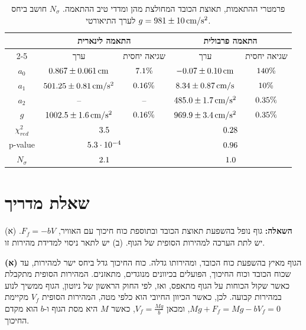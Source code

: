 \documentclass[10pt,a4paper]{article}
\newcommand{\textenglish}[1]{\foreignlanguage{english}{#1}}
\newcommand{\added}[1]{\textcolor{addedblue}{#1}}
\newcommand{\U}[1]{\,\mathrm{#1}}
\begin{document}
\begin{table}[H]
  \centering
  \renewcommand{\arraystretch}{1.3}
  \begin{tabular}{|c|c|c|c|c|}
    \hline
     & \multicolumn{2}{c|}{התאמה לינארית} & \multicolumn{2}{c|}{התאמה פרבולית} \\
    \cline{2-5}
     & ערך & שגיאה יחסית & ערך & שגיאה יחסית \\
    \hline
    $a_0$ & $\LinAZero\U{cm}$ & $7.1\%$ & $\ParAZero\U{cm}$ & $140\%$ \\ %
    \hline
    $a_1$ & $\LinAOne\U{cm/s^2}$ & $0.16\%$ & $\ParAOne\U{cm/s}$ & $10\%$ \\ %
    \hline
    $a_2$ & -- & -- & $\ParATwo\U{cm/s^2}$ & $0.35\%$ \\ %
    \hline
    $g$ & $\LinG\U{cm/s^2}$ & $0.16\%$ & $\ParG\U{cm/s^2}$ & $0.35\%$ \\ %
    \hline
    $\chi^2_{red}$ & \multicolumn{2}{c|}{$3.5$} & \multicolumn{2}{c|}{$0.28$} \\ %
    \hline
    \textenglish{p-value} & \multicolumn{2}{c|}{$5.3 \cdot 10^{-4}$} & \multicolumn{2}{c|}{$0.96$} \\ %
    \hline
    $N_\sigma$ & \multicolumn{2}{c|}{$2.1$} & \multicolumn{2}{c|}{$1.0$} \\ %
    \hline
  \end{tabular}
  \caption{\added{פרמטרי ההתאמות, תאוצת הכובד המחולצת מהן ומדדי טיב ההתאמה. $N_\sigma$ חושב ביחס לערך התיאורטי $g = \GTheo\U{cm/s^2}$.}}
  \label{tab:results}
\end{table}

\section*{שאלת מדריך}
\textbf{השאלה:} גוף נופל בהשפעת תאוצת הכובד ובתוספת כוח חיכוך עם האוויר, $F_f = -bV$. (א) יש לתת הערכה למהירות הסופית של הגוף. (ב) יש לתאר ניסוי למדידת מהירות זו.

\textbf{(א)}
הגוף מאיץ בהשפעת כוח הכובד, ומהירותו גדלה. כוח החיכוך גדל ביחס ישר למהירות, עד שכוח הכובד וכוח החיכוך, הפועלים בכיוונים מנוגדים, מתאזנים.
המהירות הסופית מתקבלת כאשר שקול הכוחות על הגוף מתאפס, ואז, לפי החוק הראשון של ניוטון, הגוף ממשיך לנוע במהירות קבועה.
לכן, כאשר הכיוון החיובי הוא כלפי מטה, המהירות הסופית $V_f$ מקיימת \added{$Mg + F_f = Mg - bV_f = 0$}, ומכאן \added{$V_f = \frac{Mg}{b}$}, כאשר $M$ היא מסת הגוף ו-$b$ הוא מקדם החיכוך.
\end{document}

